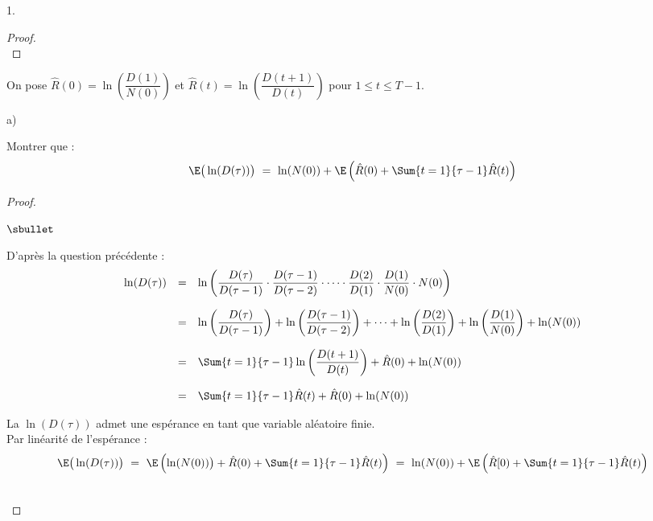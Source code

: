 \documentclass[11pt]{article}%
\begin{document}
\begin{noliste}{1.}
\begin{proof}
    ~\\[-1.4cm]
  \end{proof}
  
  
  
  \noindent
  On pose $\hat{R}(0) = \ln \left( \dfrac{D(1)}{N(0)}\right)$ et 
  $\hat{R}(t) = \ln \left( \dfrac{D(t+1)}{D(t)}\right)$ pour $1 \leq t 
  \leq T-1$.
  
  \item 
  \begin{noliste}{a)}
    \setlength{\itemsep}{2mm}
    \item Montrer que :
    \[
      \E\big(\ln(D(\tau))\big) \ = \ \ln(N(0)) + \E\left( \hat{R}(0)
      + \Sum{t=1}{\tau -1} \hat{R}(t)\right)
    \]
    
    \begin{proof}~
      \begin{noliste}{$\sbullet$}
	\item D'après la question précédente : 
	\[
	  \begin{array}{rcl}
	    \ln(D(\tau)) &=& \ln \left( \dfrac{D(\tau)}{D(\tau -1)}
	    \cdot \dfrac{D(\tau-1)}{D(\tau -2)} \cdot \cdots \cdot
	    \dfrac{D(2)}{D(1)} \cdot \dfrac{D(1)}{N(0)} \cdot N(0)
	    \right)
	    \\[.6cm]
	    &=& \ln\left( \dfrac{D(\tau)}{D(\tau -1)}\right) + 
	    \ln\left(\dfrac{D(\tau-1)}{D(\tau-2)}\right) +
	    \cdots + \ln\left(\dfrac{D(2)}{D(1)}\right) + 
	    \ln\left(\dfrac{D(1)}{N(0)}\right) + \ln(N(0))
	    \\[.6cm]
	    &=& \Sum{t=1}{\tau-1} \ln \left(\dfrac{D(t+1)}{D(t)}\right)
	    + \hat{R}(0) + \ln(N(0))
	    \\[.6cm]
	    &=& \Sum{t=1}{\tau-1} \hat{R}(t) + \hat{R}(0) + \ln(N(0))
	  \end{array}
	\]
	
	
	
	
	\item La \var $\ln(D(\tau))$ admet une espérance en tant que 
	variable aléatoire finie.\\
	Par linéarité de l'espérance :
	\[
	  \E\big(\ln(D(\tau))\big) \ = \ \E\left(\ln(N(0))\big) +
	  \hat{R}(0) + \Sum{t=1}{\tau-1} \hat{R}(t)\right) \ = \
	  \ln(N(0)) + \E\left(\hat{R}[0) + \Sum{t=1}{\tau-1}
	  \hat{R}(t)\right)
	\]
      \end{noliste}
      ~\\[-1cm]
    \end{proof}
    

\end{noliste}
\end{noliste}
\end{document}
